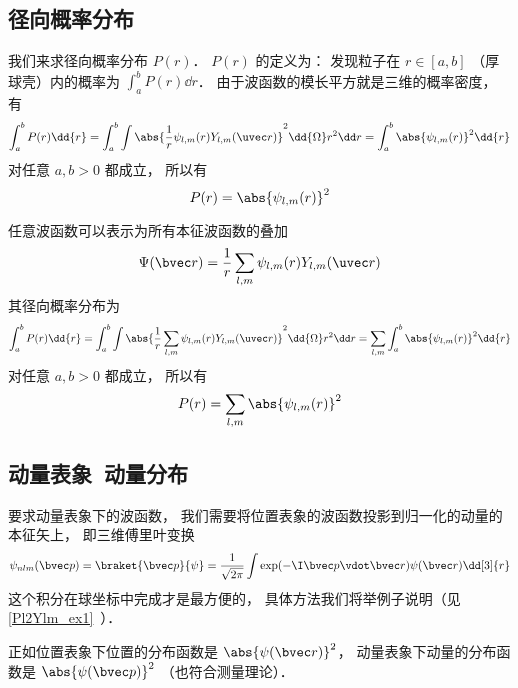 \subsection{径向概率分布}
我们来求径向概率分布 $P(r)$． $P(r)$ 的定义为： 发现粒子在 $r \in [a, b]$ （厚球壳）内的概率为 $\int_a^b P(r) \dd{r}$． 由于波函数的模长平方就是三维的概率密度， 有
\begin{equation}
\int_a^b P(r) \dd{r} = \int_a^b \int \abs{\frac1r \psi_{l,m}(r) Y_{l,m}(\uvec r)}^2 \dd{\Omega} r^2 \dd r
= \int_a^b \abs{\psi_{l,m}(r)}^2 \dd{r}
\end{equation}
对任意 $a, b > 0$ 都成立， 所以有
\begin{equation}
P(r) = \abs{\psi_{l,m}(r)}^2
\end{equation}

任意波函数可以表示为所有本征波函数的叠加
\begin{equation}
\Psi(\bvec r) = \frac1r \sum_{l,m} \psi_{l,m}(r) Y_{l,m}(\uvec r)
\end{equation}
其径向概率分布为
\begin{equation}\label{HWF_eq4}
\int_a^b P(r) \dd{r} = \int_a^b \int \abs{\frac1r \sum_{l,m}\psi_{l,m}(r) Y_{l,m}(\uvec r)}^2 \dd{\Omega} r^2 \dd r
= \sum_{l,m} \int_a^b \abs{\psi_{l,m}(r)}^2 \dd{r}
\end{equation}
对任意 $a, b > 0$ 都成立， 所以有
\begin{equation}
P(r) = \sum_{l,m} \abs{\psi_{l,m}(r)}^2
\end{equation}

\subsection{动量表象\ 动量分布}
要求动量表象下的波函数， 我们需要将位置表象的波函数投影到归一化的动量的本征矢上， 即三维傅里叶变换
\begin{equation}
\psi_{nlm}(\bvec p) = \braket{\bvec p}{\psi} = \frac{1}{\sqrt{2\pi}} \int \exp(-\I \bvec p \vdot \bvec r) \psi(\bvec r) \dd[3]{r}
\end{equation}
这个积分在球坐标中完成才是最方便的， 具体方法我们将举例子说明（见\autoref{Pl2Ylm_ex1}~）．

正如位置表象下位置的分布函数是 $\abs{\psi(\bvec r)}^2$， 动量表象下动量的分布函数是 $\abs{\psi(\bvec p)}^2$ （也符合测量理论）．
